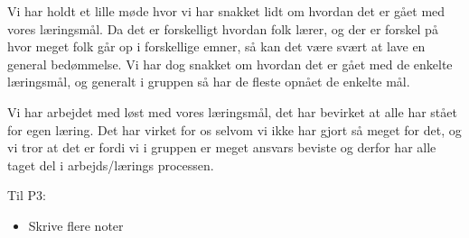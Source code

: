 Vi har holdt et lille m\o{}de hvor vi har snakket lidt om hvordan det er g\aa{}et med vores l\ae{}ringsm\aa{}l. Da det er forskelligt hvordan folk l\ae{}rer, og der er forskel p\aa{} hvor meget folk g\aa{}r op i forskellige emner, s\aa{} kan det v\ae{}re sv\ae{}rt at lave en general bed\o{}mmelse. Vi har dog snakket om hvordan det er g\aa{}et med de enkelte l\ae{}ringsm\aa{}l, og generalt i gruppen s\aa{} har de fleste opn\aa{}et de enkelte m\aa{}l.

Vi har arbejdet med løst med vores læringsmål, det har bevirket at alle har stået for egen læring. Det har virket for os selvom vi ikke har gjort så meget for det, og vi tror at det er fordi vi i gruppen er meget ansvars beviste og derfor har alle taget del i arbejds/lærings processen.

Til P3:

\begin{itemize}
	\item Skrive flere noter 
\end{itemize}

